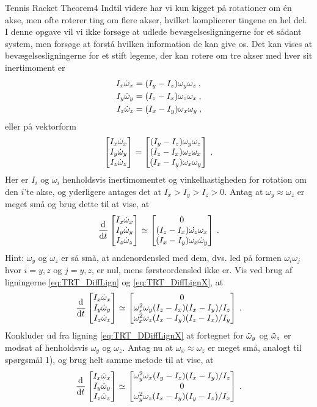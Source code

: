 \begin{opgave}{Tennis Racket Theorem}{4}
Indtil videre har vi kun kigget på rotationer om én akse, men ofte roterer ting om flere akser, hvilket komplicerer tingene en hel del. I denne opgave vil vi ikke forsøge at udlede bevægelsesligningerne for et sådant system, men forsøge at forstå hvilken information de kan give os. Det kan vises at bevægelsesligningerne for et stift legeme, der kan rotere om tre akser med hver sit inertimoment er
\begin{align*}
	I_x\dot{\omega}_x &= (I_y-I_z)\omega_y\omega_z \: , \\
	I_y\dot{\omega}_y &= (I_z-I_x)\omega_z\omega_x \: , \\
	I_z\dot{\omega}_z &= (I_x-I_y)\omega_x\omega_y \: ,
\end{align*}
eller på vektorform
\begin{align} \label{eq:TRT_DiffLign}
	\begin{bmatrix} I_x\dot{\omega}_x \\ I_y\dot{\omega}_y \\ I_z\dot{\omega}_z \end{bmatrix} = \begin{bmatrix} (I_y-I_z)\omega_y\omega_z \\ (I_z-I_x)\omega_z\omega_x \\ (I_x-I_y)\omega_x\omega_y \end{bmatrix} \: .
\end{align}
Her er $I_i$ og $\omega_i$ henholdsvis inertimomentet og vinkelhastigheden for rotation om den $i$'te akse, og yderligere antages det at $I_x>I_y>I_z>0$.
\opg Antag at $\omega_y \approx \omega_z$ er meget små og brug dette til at vise, at
\begin{align} \label{eq:TRT_DiffLignX}
	\frac{\mathrm{d}^{}{}}{{\mathrm{d} {t}}^{}}\begin{bmatrix} I_x\dot{\omega}_x \\ I_y\dot{\omega}_y \\ I_z\dot{\omega}_z \end{bmatrix} \simeq \begin{bmatrix} 0 \\ (I_z-I_x)\dot{\omega_z}\omega_x \\ (I_x-I_y)\omega_x\dot{\omega}_y \end{bmatrix} \: .
\end{align}
Hint: $\omega_y$ og $\omega_z$ er så små, at andenordensled med dem, dvs. led på formen $\omega_i\omega_j$ hvor $i=y,z$ og $j=y,z$, er nul, mens førsteordensled ikke er.
\opg Vis ved brug af ligningerne \eqref{eq:TRT_DiffLign} og \eqref{eq:TRT_DiffLignX}, at
\begin{align} \label{eq:TRT_DDiffLignX}
	\frac{\mathrm{d}^{}{}}{{\mathrm{d} {t}}^{}}\begin{bmatrix} I_x\dot{\omega}_x \\ I_y\dot{\omega}_y \\ I_z\dot{\omega}_z \end{bmatrix} \simeq \begin{bmatrix} 0 \\ \omega_x^2\omega_y(I_z-I_x)(I_x-I_y)/I_z \\ \omega_x^2\omega_z(I_x-I_y)(I_z-I_x)/I_y \end{bmatrix} \: .
\end{align}
\opg Konkluder ud fra ligning \eqref{eq:TRT_DDiffLignX} at fortegnet for $\ddot{\omega}_y$ og $\ddot{\omega}_z$ er modsat af henholdsvis $\omega_y$ og $\omega_z$.
\opg Antag nu at $\omega_x \approx \omega_z$ er meget små, analogt til spørgsmål 1), og brug helt samme metode til at vise, at
\begin{align} \label{eq:TRT_DiffLignY}
	\dif{t}{}\xyz{I_x\dt{\omega}_x}{I_y\dt{\omega}_y}{I_z\dt{\omega}_z} \simeq \xyz{\omega_y^2\omega_x(I_y-I_z)(I_x-I_y)/I_z}{0}{\omega_y^2\omega_z(I_x-I_y)(I_y-I_z)/I_x} \: .

\end{align}
\end{opgave}
